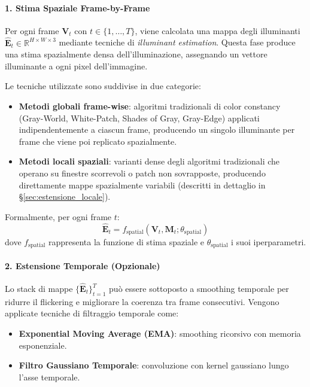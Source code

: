 \paragraph{1. Stima Spaziale Frame-by-Frame}
Per ogni frame $\mathbf{V}_t$ con $t \in \{1, \ldots, T\}$, viene calcolata una mappa degli illuminanti $\hat{\mathbf{E}}_t \in \mathbb{R}^{H \times W \times 3}$ mediante tecniche di \emph{illuminant estimation}. Questa fase produce una stima spazialmente densa dell'illuminazione, assegnando un vettore illuminante a ogni pixel dell'immagine.

Le tecniche utilizzate sono suddivise in due categorie:
\begin{itemize}
    \item \textbf{Metodi globali frame-wise}: algoritmi tradizionali di color constancy (Gray-World, White-Patch, Shades of Gray, Gray-Edge) applicati indipendentemente a ciascun frame, producendo un singolo illuminante per frame che viene poi replicato spazialmente.
    \item \textbf{Metodi locali spaziali}: varianti dense degli algoritmi tradizionali che operano su finestre scorrevoli o patch non sovrapposte, producendo direttamente mappe spazialmente variabili (descritti in dettaglio in \S\ref{sec:estensione_locale}).
\end{itemize}

Formalmente, per ogni frame $t$:
\begin{equation}
    \hat{\mathbf{E}}_t = f_{\text{spatial}}(\mathbf{V}_t, \mathbf{M}_t; \theta_{\text{spatial}})
    \label{eq:spatial_estimation}
\end{equation}
dove $f_{\text{spatial}}$ rappresenta la funzione di stima spaziale e $\theta_{\text{spatial}}$ i suoi iperparametri.

\paragraph{2. Estensione Temporale (Opzionale)}
Lo stack di mappe $\{\hat{\mathbf{E}}_t\}_{t=1}^T$ può essere sottoposto a smoothing temporale per ridurre il flickering e migliorare la coerenza tra frame consecutivi. Vengono applicate tecniche di filtraggio temporale come:
\begin{itemize}
    \item \textbf{Exponential Moving Average (EMA)}: smoothing ricorsivo con memoria esponenziale.
    \item \textbf{Filtro Gaussiano Temporale}: convoluzione con kernel gaussiano lungo l'asse temporale.
\end{itemize}

